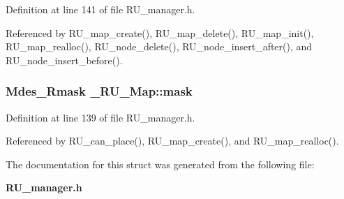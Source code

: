 Definition at line 141 of file RU\_\-manager.h.

Referenced by RU\_\-map\_\-create(), RU\_\-map\_\-delete(), RU\_\-map\_\-init(), RU\_\-map\_\-realloc(), RU\_\-node\_\-delete(), RU\_\-node\_\-insert\_\-after(), and RU\_\-node\_\-insert\_\-before().
\subsubsection{\setlength{\rightskip}{0pt plus 5cm}Mdes\_\-Rmask \bf{\_\-RU\_\-Map::mask}}\label{struct__RU__Map_6fb02fdb5d39ca9700fcef3b8d852cc2}




Definition at line 139 of file RU\_\-manager.h.

Referenced by RU\_\-can\_\-place(), RU\_\-map\_\-create(), and RU\_\-map\_\-realloc().

The documentation for this struct was generated from the following file:\begin{CompactItemize}
\item 
\bf{RU\_\-manager.h}\end{CompactItemize}

